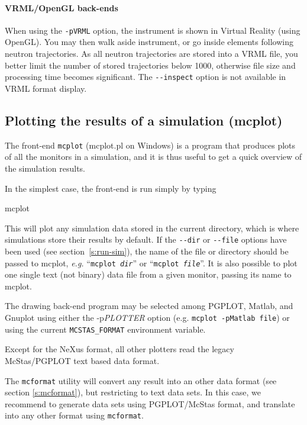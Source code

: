 \paragraph{VRML/OpenGL back-ends}

When using the \verb+-pVRML+ option, the instrument is shown in Virtual Reality
(using OpenGL). You may then walk aside instrument, or go inside elements
following neutron trajectories. As all neutron trajectories are stored into a
VRML file, you better limit the number of stored trajectories below 1000,
otherwise file size and processing time becomes significant. The
\verb+--inspect+ option is not available in VRML format display.

\subsection{Plotting the results of a simulation (mcplot)}
\label{s:mcplot}

The front-end \verb+mcplot+ (mcplot.pl on Windows) is a program that produces
plots of all the monitors in a simulation, and it is thus useful to get
a quick overview of the simulation results.

In the simplest case, the front-end is run simply by typing
\begin{bash}
    mcplot
\end{bash}
This will plot any simulation data stored in the current directory, which is
where simulations store their results by default. If the \verb+--dir+ or
\verb+--file+ options have been used (see section~\ref{s:run-sim}), the name of
the file or directory should be passed to mcplot, {\em e.g.} ``\texttt{mcplot
  \textit{dir}}'' or ``\texttt{mcplot \textit{file}}''.  It is also possible to plot
one single text (not binary) data file from a given monitor, passing its name to
mcplot.

The drawing back-end program may be selected among PGPLOT, Matlab, and
Gnuplot using either the -p\textit{PLOTTER} option (e.g. \texttt{mcplot -pMatlab
file}) or using the current \verb+MCSTAS_FORMAT+ environment
variable.

Except for the NeXus format, all other plotters read the legacy 
McStas/PGPLOT text based data format. 

The \verb+mcformat+ utility will convert any \MCS
result into an other data format (see section \ref{s:mcformat}), but restricting to text
data sets. In this case, we recommend to generate data sets using PGPLOT/McStas
format, and translate into any other format using \verb+mcformat+.

